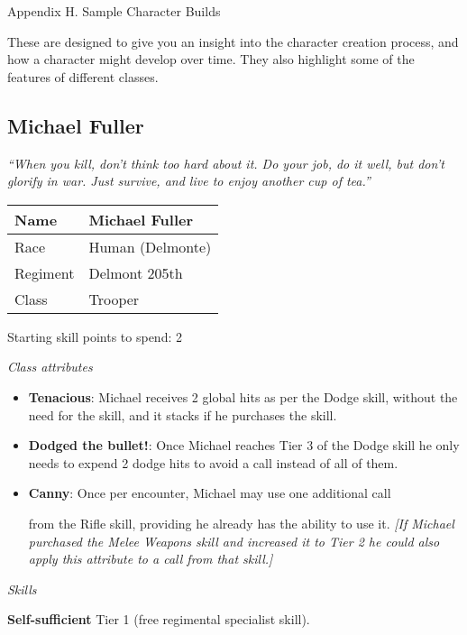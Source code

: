 \documentclass{scrbook}
\begin{document}
Appendix H. Sample Character Builds

These are designed to give you an insight into the character creation process, and how a character might develop over time. They also highlight some of the features of different classes.

\subsection{Michael Fuller}

\textit{``When you kill, don't think too hard about it. Do your job, do it well, but don't glorify in war. Just survive, and live to enjoy another cup of tea.''}

\begin{table}
\begin{tabular}{|l|l|} \hline 
Name & Michael Fuller \\
 \hline Race & Human (Delmonte) \\
 \hline Regiment & Delmont 205th \\
 \hline Class & Trooper \\
 \hline \end{tabular}

\end{table}

Starting skill points to spend: 2

\textit{Class attributes}

\begin{itemize}
\item \textbf{Tenacious}: Michael receives 2 global hits as per the Dodge skill, without the need for the skill, and it stacks if he purchases the skill.

\item \textbf{Dodged the bullet!}: Once Michael reaches Tier 3 of the Dodge skill he only needs to expend 2 dodge hits to avoid a call instead of all of them.

\item \textbf{Canny}: Once per encounter, Michael may use one additional call

from the Rifle skill, providing he already has the ability to use it. \textit{{[}If Michael purchased the Melee Weapons skill and increased it to Tier 2 he could also apply this attribute to a call from that skill.{]}}

\end{itemize}
\textit{Skills}

\textbf{Self-sufficient} Tier 1 (free regimental specialist skill).
\end{document}
